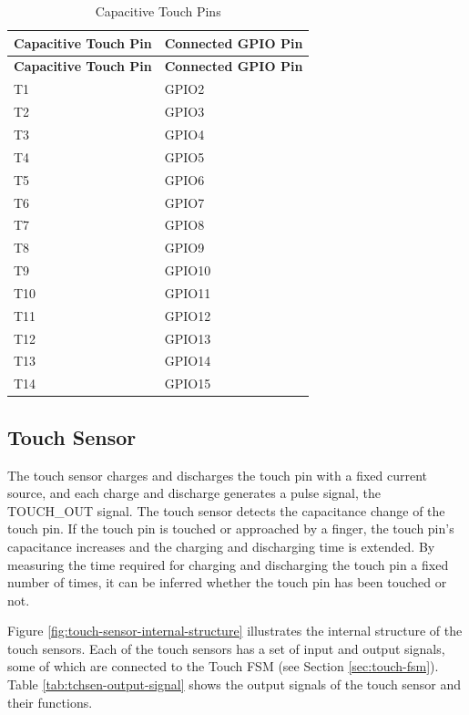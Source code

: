 \documentclass[main\_\_EN.tex]{subfiles}
\begin{document}
\begin{longtable}[c]{|p{4.0cm}|p{6.0cm}| }
    \caption{\chipname{} Capacitive Touch Pins}
    \label{tab:touch-pads}
    \\\hline
    \rowcolor{lightgray}
    \textbf{Capacitive Touch Pin} & \textbf{Connected GPIO Pin} \\ 
    \hline
    \endfirsthead
    \hline
    \rowcolor{lightgray}
    \textbf{Capacitive Touch Pin} & \textbf{Connected GPIO Pin} \\  
    \hline
    \endhead
    \endfoot
    \endlastfoot
    T1  &  GPIO2 \\\hline
    T2  &  GPIO3 \\\hline
    T3  &  GPIO4  \\\hline
    T4  &  GPIO5  \\\hline
    T5  &  GPIO6  \\\hline
    T6  &  GPIO7  \\\hline
    T7  &  GPIO8 \\\hline
    T8  &  GPIO9 \\\hline
    T9  &  GPIO10 \\\hline
    T10  &  GPIO11 \\\hline
    T11 &  GPIO12 \\\hline
    T12 &  GPIO13 \\\hline
    T13 &  GPIO14 \\\hline
    T14 &  GPIO15 \\\hline
\end{longtable}

\subsection{Touch Sensor}

The touch sensor charges and discharges the touch pin with a fixed current source, and each charge and discharge generates a pulse signal, the TOUCH\_OUT signal. The touch sensor detects the capacitance change of the touch pin. If the touch pin is touched or approached by a finger, the touch pin's capacitance increases and the charging and discharging time is extended. By measuring the time required for charging and discharging the touch pin a fixed number of times, it can be inferred whether the touch pin has been touched or not.

Figure \ref{fig:touch-sensor-internal-structure} illustrates the internal structure of the touch sensors. Each of the touch sensors has a set of input and output signals, some of which are connected to the Touch FSM (see Section \ref{sec:touch-fsm}). Table \ref{tab:tchsen-output-signal} shows the output signals of the touch sensor and their functions.
\end{document}

